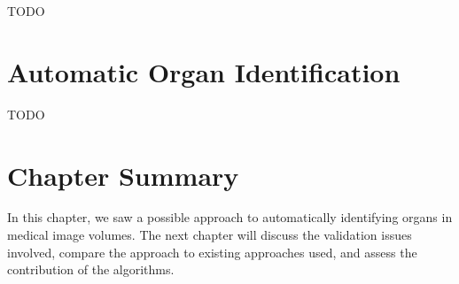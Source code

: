 TODO

\section{Automatic Organ Identification}

TODO

\section{Chapter Summary}

In this chapter, we saw a possible approach to automatically identifying organs in medical image volumes. The next chapter will discuss the validation issues involved, compare the approach to existing approaches used, and assess the contribution of the algorithms.

